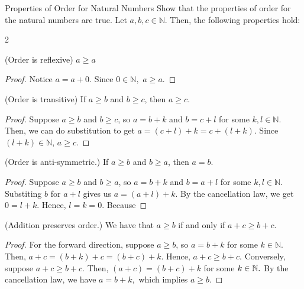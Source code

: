 \begin{problem}{Properties of Order for Natural Numbers}
    Show that the properties of order for the natural numbers are true. Let $a, b, c \in \mathbb{N}.$ 
    Then, the following properties hold:
\end{problem}
\begin{multicols}{2}
\begin{proposition}
    (Order is reflexive) $a \geq a$
\end{proposition}
\begin{proof}
    Notice $a = a + 0.$ Since $0 \in \mathbb{N},$ $a \geq a.$
\end{proof}

\begin{proposition}
    (Order is transitive) If $a \geq b$ and $b \geq c$, then $a \geq c.$
\end{proposition}
\begin{proof}
    Suppose $a \geq b$ and $b \geq c$, so $a = b + k$ and $b = c + l$ for some $k, l \in \mathbb{N}.$
    Then, we can do substitution to get $a = (c + l) + k = c + (l + k).$ 
    Since $(l + k) \in \mathbb{N}$, $a \geq c.$
\end{proof}


\begin{proposition}
    (Order is anti-symmetric.) 
    If $a \geq b$ and $b \geq a$, then $a = b.$
\end{proposition}

\begin{proof}
    Suppose $a \geq b$ and $b \geq a$, so $a = b + k$ and $b = a + l$ for some $k, l \in \mathbb{N}.$ 
    Substiting $b$ for $a + l$ gives us $a = (a + l) + k$. 
    By the cancellation law, we get $0 = l + k.$
    Hence, $l = k = 0.$
    Because 
\end{proof}

\begin{proposition}
    (Addition preserves order.)
    We have that $a \geq b$ if and only if $a + c \geq b + c.$
\end{proposition}
\begin{proof}
    For the forward direction, suppose $a \geq b$, so $a = b + k$ for some $k \in \mathbb{N}.$
    Then, $a + c = (b + k) + c = (b + c) + k.$ Hence, $a + c \geq b + c.$
    Conversely, suppose $a + c \geq b + c.$ 
    Then, $(a + c) = (b +c) + k$ for some $k \in \mathbb{N}.$
    By the cancellation law, we have $a = b + k,$ which implies $a \geq b.$
\end{proof}


\end{multicols}
